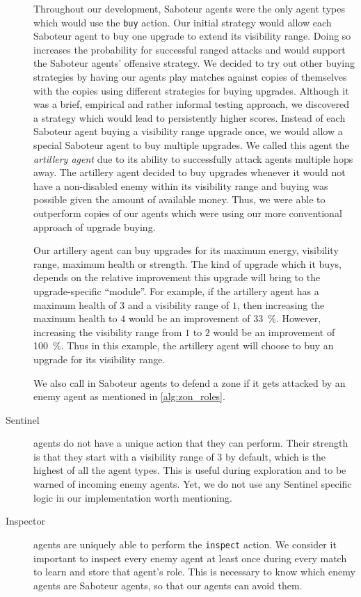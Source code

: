 \begin{description}
        Throughout our development, Saboteur agents were the only agent types which would use the \texttt{buy} action.
        Our initial strategy would allow each Saboteur agent to buy one upgrade to extend its visibility range.
        Doing so increases the probability for successful ranged attacks \cite{ahlbrecht_mapc_2014} and would support the Saboteur agents' offensive strategy.
        We decided to try out other buying strategies by having our agents play matches against copies of themselves with the copies using different strategies for buying upgrades.
        Although it was a brief, empirical and rather informal testing approach, we discovered a strategy which would lead to persistently higher scores.
        Instead of each Saboteur agent buying a visibility range upgrade once, we would allow a special Saboteur agent to buy multiple upgrades.
        We called this agent the \emph{artillery agent} due to its ability to successfully attack agents multiple hops away.
        The artillery agent decided to buy upgrades whenever it would not have a non-disabled enemy within its visibility range and buying was possible given the amount of available money.
        Thus, we were able to outperform copies of our agents which were using our more conventional approach of upgrade buying.

        Our artillery agent can buy upgrades for its maximum energy, visibility range, maximum health or strength.
        The kind of upgrade which it buys, depends on the relative improvement this upgrade will bring to the upgrade-specific \enquote{module}.
        For example, if the artillery agent has a maximum health of $3$ and a visibility range of $1$, then increasing the maximum health to $4$ would be an improvement of \SI{33}{\percent}.
        However, increasing the visibility range from $1$ to $2$ would be an improvement of \SI{100}{\percent}.
        Thus in this example, the artillery agent will choose to buy an upgrade for its visibility range.

        We also call in Saboteur agents to defend a zone if it gets attacked by an enemy agent as mentioned in \autoref{alg:zon_roles}.
    \item[Sentinel] agents do not have a unique action that they can perform.
        Their strength is that they start with a visibility range of 3 by default, which is the highest of all the agent types.
        This is useful during exploration and to be warned of incoming enemy agents.
        Yet, we do not use any Sentinel specific logic in our implementation worth mentioning.
    \item[Inspector] agents are uniquely able to perform the \texttt{inspect} action.
        We consider it important to inspect every enemy agent at least once during every match to learn and store that agent's role.
        This is necessary to know which enemy agents are Saboteur agents, so that our agents can avoid them.


\end{description}
